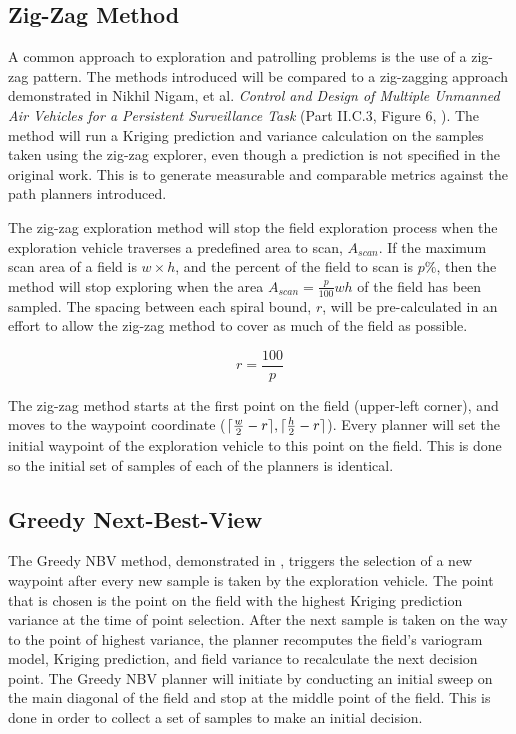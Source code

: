 \subsection{Zig-Zag Method} \label{sec:zz}
A common approach to exploration and patrolling problems is the use of a zig-zag pattern. The methods introduced will be compared to a zig-zagging approach demonstrated in Nikhil Nigam, et al. \textit{Control and Design of Multiple Unmanned Air Vehicles for a Persistent Surveillance Task} (Part II.C.3, Figure 6, \cite{nigam:zigzag}). The method will run a Kriging prediction and variance calculation on the samples taken using the zig-zag explorer, even though a prediction is not specified in the original work. This is to generate measurable and comparable metrics against the path planners introduced.

The zig-zag exploration method will stop the field exploration process when the exploration vehicle traverses a predefined area to scan, $A_{scan}$. If the maximum scan area of a field is $w \times h$, and the percent of the field to scan is $p\%$, then the method will stop exploring when the area $A_{scan} = \frac{p}{100}wh$ of the field has been sampled. The spacing between each spiral bound, $r$, will be pre-calculated in an effort to allow the zig-zag method to cover as much of the field as possible.

\begin{equation}
	\label{eq:zigzagrad}
    r = \frac{100}{p}
\end{equation}

The zig-zag method starts at the first point on the field (upper-left corner), and moves to the waypoint coordinate ($\Large\lceil\frac{w}{2} - r \Large\rceil, \Large\lceil \frac{h}{2} - r \Large\rceil$). Every planner will set the initial waypoint of the exploration vehicle to this point on the field. This is done so the initial set of samples of each of the planners is identical.

\subsection{Greedy Next-Best-View}
The Greedy NBV method, demonstrated in \cite{fentanes:soilkrig}, triggers the selection of a new waypoint after every new sample is taken by the exploration vehicle. The point that is chosen is the point on the field with the highest Kriging prediction variance at the time of point selection. After the next sample is taken on the way to the point of highest variance, the planner recomputes the field's variogram model, Kriging prediction, and field variance to recalculate the next decision point. The Greedy NBV planner will initiate by conducting an initial sweep on the main diagonal of the field and stop at the middle point of the field. This is done in order to collect a set of samples to make an initial decision.

